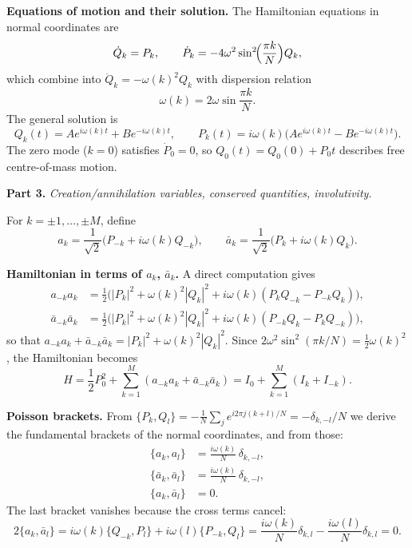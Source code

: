 \documentclass[12pt]{article}
\newcommand{\be}{\begin{equation}}
\newcommand{\ee}{\end{equation}}
\newcommand{\bea}{\begin{aligned}}
\newcommand{\eea}{\end{aligned}}
\theoremstyle{plain}
\begin{document}
\noindent\textbf{Equations of motion and their solution.}
The Hamiltonian equations in normal coordinates are
\be
  \dot{Q}_k = P_k, \qquad
  \dot{P}_k = -4\omega^2\sin^2\!\Bigl(\frac{\pi k}{N}\Bigr)Q_k,
\ee
which combine into $\ddot{Q}_k = -\omega(k)^2 Q_k$ with dispersion relation
\be
  \omega(k) = 2\omega\sin\frac{\pi k}{N}.
\ee
The general solution is
\be
  Q_k(t) = Ae^{i\omega(k)t} + Be^{-i\omega(k)t}, \qquad
  P_k(t) = i\omega(k)\bigl(Ae^{i\omega(k)t} - Be^{-i\omega(k)t}\bigr).
\ee
The zero mode ($k=0$) satisfies $\dot{P}_0 = 0$, so $Q_0(t) = Q_0(0) + P_0 t$ describes free
centre-of-mass motion.

\bigskip

\noindent\textbf{Part 3.} \textit{Creation/annihilation variables, conserved quantities, involutivity.}

\medskip
\noindent For $k = \pm 1, \ldots, \pm M$, define
\be
  a_k = \frac{1}{\sqrt{2}}\bigl(P_{-k} + i\omega(k)Q_{-k}\bigr), \qquad
  \bar{a}_k = \frac{1}{\sqrt{2}}\bigl(P_k + i\omega(k)Q_k\bigr).
\ee

\noindent\textbf{Hamiltonian in terms of $a_k$, $\bar{a}_k$.}
A direct computation gives
\be\bea
  a_{-k}a_k &= \tfrac{1}{2}\bigl(|P_k|^2 + \omega(k)^2|Q_k|^2
                + i\omega(k)(P_kQ_{-k} - P_{-k}Q_k)\bigr), \\
  \bar{a}_{-k}\bar{a}_k &= \tfrac{1}{2}\bigl(|P_k|^2 + \omega(k)^2|Q_k|^2
                + i\omega(k)(P_{-k}Q_k - P_kQ_{-k})\bigr),
\eea\ee
so that $a_{-k}a_k + \bar{a}_{-k}\bar{a}_k = |P_k|^2 + \omega(k)^2|Q_k|^2$. 
Since $2\omega^2\sin^2(\pi k/N) = \frac{1}{2}\omega(k)^2$, the Hamiltonian becomes
\be
  \boxed{H = \frac{1}{2}P_0^2 + \sum_{k=1}^M (a_{-k}a_k + \bar{a}_{-k}\bar{a}_k)
           = I_0 + \sum_{k=1}^M (I_k + I_{-k}).}
\ee

\noindent\textbf{Poisson brackets.}
From $\{P_k, Q_l\} = -\frac{1}{N}\sum_j e^{i2\pi j(k+l)/N} = -\delta_{k,-l}/N$
we derive the fundamental brackets of the normal coordinates, and from those:
\be\bea
  \{a_k, a_l\} &= \frac{i\omega(k)}{N}\,\delta_{k,-l}, \\[4pt]
  \{\bar{a}_k, \bar{a}_l\} &= \frac{i\omega(k)}{N}\,\delta_{k,-l}, \\[4pt]
  \{a_k, \bar{a}_l\} &= 0.
\eea\ee
The last bracket vanishes because the cross terms cancel:
\be
  2\{a_k, \bar{a}_l\}
  = i\omega(k)\{Q_{-k}, P_l\} + i\omega(l)\{P_{-k}, Q_l\}
  = \frac{i\omega(k)}{N}\delta_{k,l} - \frac{i\omega(l)}{N}\delta_{k,l} = 0.
\ee
\end{document}
